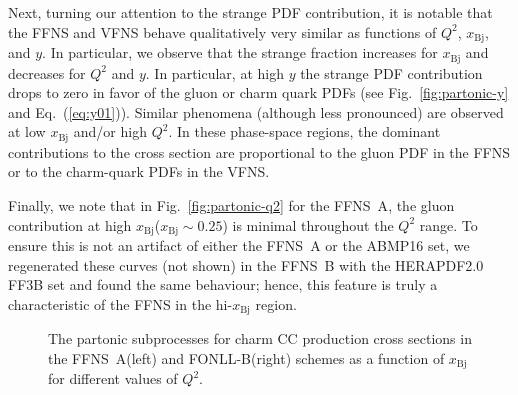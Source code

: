 \documentclass[pdftex,twocolumn,epjc3]{svjour3}          %
\newcommand{\abmp} {ABMP16\xspace}
\newcommand{\xbj}{\ensuremath{x_{\text{Bj}}}\xspace}
\newcommand{\fonll} {{FONLL-B}\xspace}
\newcommand{\ffns} {{FFNS~A}\xspace}
\newcommand{\ffnsb} {{FFNS~B}\xspace}
\newcommand{\ffthreeb} {{\hbox{HERAPDF2.0} FF3B}\xspace}
\begin{document}
Next, turning our attention to the strange PDF contribution, it is
notable that the FFNS and VFNS behave qualitatively very similar as
functions of $Q^2$, \xbj, and $y$. In particular, we observe that the
strange fraction increases for \xbj and decreases for $Q^2$ and $y$.
%
In particular, at high $y$ the strange PDF contribution drops to zero
in favor of the gluon or charm quark PDFs (see
Fig.~\ref{fig:partonic-y} and Eq.~(\ref{eq:y01})). Similar phenomena
(although less pronounced) are observed at low \xbj and/or high
$Q^2$. In these phase-space regions, the dominant contributions to the
cross section are proportional to the gluon PDF in the FFNS or to the
charm-quark PDFs in the VFNS.


  Finally, we note that in Fig.~\ref{fig:partonic-q2} for the  \ffns,
  the gluon contribution at high \xbj ($\xbj\sim 0.25$) is minimal throughout
  the $Q^2$ range. To ensure this is not an artifact of either the \ffns or the \abmp set,
  we regenerated these curves (not shown) in the \ffnsb with the \ffthreeb set and found the same behaviour;
  hence, this feature is truly a characteristic of the FFNS in the hi-\xbj region.



\begin{figure}
  \centering
  \caption{The partonic subprocesses for charm CC production cross
    sections in the \ffns (left) and \fonll (right) schemes as a
    function of \xbj for different values of $Q^2$.}
  \label{fig:partonic-x}
\end{figure}
\end{document}
